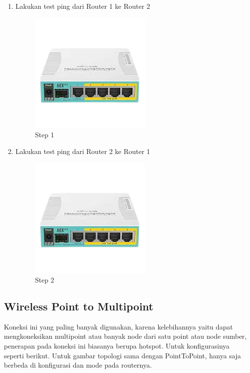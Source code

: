 \begin{enumerate}
	\item Lakukan test ping dari Router 1 ke Router 2
	\begin{figure}[H]
		\centering
		\includegraphics[width=0.5\linewidth]{P1/img/contoh.png}
		\caption{Step 1}
		\label{fig:gambar8}
	\end{figure}

	\item Lakukan test ping dari Router 2 ke Router 1
	\begin{figure}[H]
		\centering
		\includegraphics[width=0.5\linewidth]{P1/img/contoh.png}
		\caption{Step 2}
		\label{fig:gambar9}
	\end{figure}

\end{enumerate}

\subsection{Wireless Point to Multipoint}
Koneksi ini yang paling banyak digunakan, karena kelebihannya yaitu dapat mengkoneksikan multipoint atau banyak node dari satu point atau node sumber, penerapan pada koneksi ini biasanya berupa
hotspot. Untuk konfigurasinya seperti berikut. Untuk gambar topologi sama dengan PointToPoint,
hanya saja berbeda di konfigurasi dan mode pada routernya.

